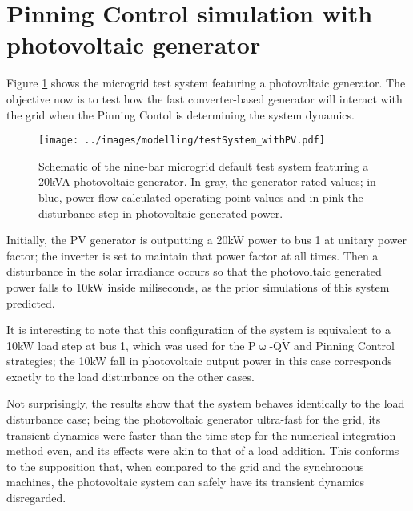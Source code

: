 \section{Pinning Control simulation with photovoltaic generator} %

	Figure \ref{fig:testSystemwithPV} shows the microgrid test system featuring a photovoltaic generator. The objective now is to test how the fast converter-based generator will interact with the grid when the Pinning Contol is determining the system dynamics.

\begin{figure}[htb]
	\begin{center}
		\texttt{[image: ../images/modelling/testSystem\_withPV.pdf]}
		\caption[Schematic of the nine-bar microgrid default test system featuring a 20kVA photovoltaic generator.]{Schematic of the nine-bar microgrid default test system featuring a 20kVA photovoltaic generator. In gray, the generator rated values; in blue, power-flow calculated operating point values and in pink the disturbance step in photovoltaic generated power.}
		\label{fig:testSystemwithPV}
	\end{center}
\end{figure}

	Initially, the PV generator is outputting a 20kW power to bus 1 at unitary power factor; the inverter is set to maintain that power factor at all times. Then a disturbance in the solar irradiance occurs so that the photovoltaic generated power falls to 10kW inside miliseconds, as the prior simulations of this system predicted.

	It is interesting to note that this configuration of the system is equivalent to a 10kW load step at bus 1, which was used for the P$\upomega$-Q$\dot{\text{V}}$ and Pinning Control strategies; the 10kW fall in photovoltaic output power in this case corresponds exactly to the load disturbance on the other cases.

	Not surprisingly, the results show that the system behaves identically to the load disturbance case; being the photovoltaic generator ultra-fast for the grid, its transient dynamics were faster than the time step for the numerical integration method even, and its effects were akin to that of a load addition. This conforms to the supposition that, when compared to the grid and the synchronous machines, the photovoltaic system can safely have its transient dynamics disregarded.

